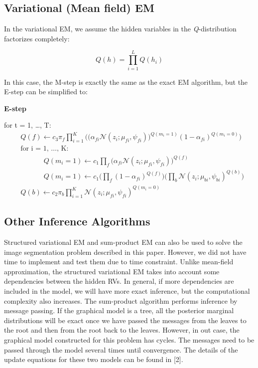 \documentclass{article} %
\begin{document}
\subsection{Variational (Mean field) EM}
\label{variational_em}

In the variational EM, we assume the hidden variables in the \textit{Q}-distribution factorizes completely:

\begin{equation}
Q(h) = \prod_{i=1}^LQ(h_i) 
\label{eq:eq9}
\end{equation}

In this case, the M-step is exactly the same as the exact EM algorithm, but the E-step can be simplified to:

\textbf{E-step}

for t = 1, \ldots , T:
\begin{align*} 
&Q(f) \leftarrow c_3\pi_f\prod_{i=1}^K\Bigg(\Big(\alpha_{fi}\mathcal{N}(z_i;\mu_{fi},\psi_{fi})\Big)^{Q(m_i=1)} (1-\alpha_{fi})^{Q(m_i=0)} \Bigg) \\
&\text{for i = 1, \ldots , K: } \\
&\text{ }\text{ }\text{ }\text{ }\text{ }Q(m_i = 1) \leftarrow c_1\prod_{f}\Bigg(\alpha_{fi}\mathcal{N}(z_i;\mu_{fi},\psi_{fi})\Bigg)^{Q(f)}\\
&\text{ }\text{ }\text{ }\text{ }\text{ }Q(m_i = 1) \leftarrow c_1\Bigg(\prod_{f}(1-\alpha_{fi})^{Q(f)}\Bigg)\Bigg(\prod_{b}\mathcal{N}(z_i;\mu_{bi},\psi_{bi})^{Q(b)}\Bigg)\\
&Q(b) \leftarrow c_2\pi_b\prod_{i=1}^K\mathcal{N}(z_i;\mu_{fi},\psi_{fi})^{Q(m_i=0)}
\end{align*} 

\subsection{Other Inference Algorithms}
Structured variational EM and sum-product EM can also be used to solve the image segmentation problem described in this paper. However, we did not have time to implement and test them due to time constraint. Unlike mean-field approximation, the structured variational EM takes into account some dependencies between the hidden RVs. In general, if more dependencies are included in the model, we will have more exact inference, but the computational complexity also increases. The sum-product algorithm performs inference by message passing. If the graphical model is a tree, all the posterior marginal distributions will be exact once we have passed the messages from the leaves to the root and then from the root back to the leaves. However, in out case, the graphical model constructed for this problem has cycles. The messages need to be passed through the model several times until convergence. The details of the update equations for these two models can be found in [2].
\end{document}
